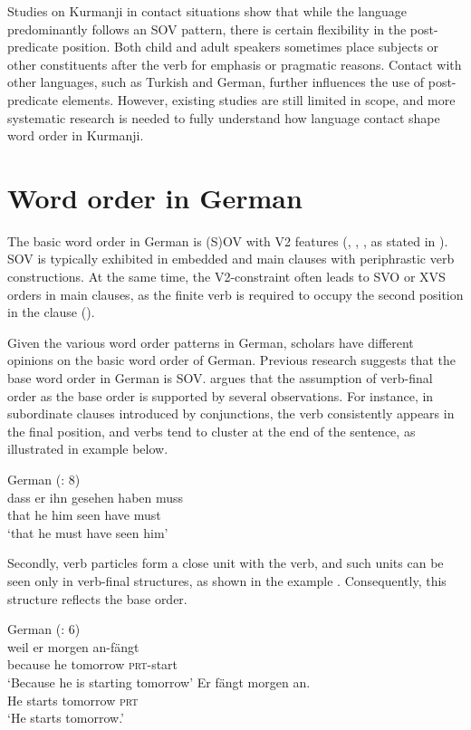 Studies on Kurmanji in contact situations show that while the language predominantly follows an SOV pattern, there is certain flexibility in the post-predicate position. Both child and adult speakers sometimes place subjects or other constituents after the verb for emphasis or pragmatic reasons. Contact with other languages, such as Turkish and German, further influences the use of post-predicate elements. However, existing studies are still limited in scope, and more systematic research is needed to fully understand how language contact shape word order in Kurmanji.

\section{Word order in German}\label{sec:key:3.5}

The basic word order in German is (S)OV with V2 features (\citealt{Fourquet1977}, \citealt{Bach1962}, \citealt{Bierwisch1966}, as stated in \citealt{kiss_41_2015}). SOV is typically exhibited in embedded and main clauses with periphrastic verb constructions. At the same time, the V2-constraint often leads to SVO or XVS orders in main clauses, as the finite verb is required to occupy the second position in the clause (\citealt{Czinglar2013, Czinglar2014}).

Given the various word order patterns in German, scholars have different opinions on the basic word order of German. Previous research suggests that the base word order in German is SOV. \citet{Muller2023} argues that the assumption of verb-final order as the base order is supported by several observations. For instance, in subordinate clauses introduced by conjunctions, the verb consistently appears in the final position, and verbs tend to cluster at the end of the sentence, as illustrated in example  below.

\ea%
  \label{ex:key:19} German (\citealt{Muller2023}: 8) \\
\gll dass  er  ihn  gesehen  haben  muss \\
that  he  him  seen    have  must\\
\glt ‘that he must have seen him’ 
  \z

Secondly, verb particles form a close unit with the verb, and such units can be seen only in verb-final structures, as shown in the example . Consequently, this structure reflects the base order.

\ea \label{ex:key:20} German (\citealt{Muller2023}: 6) \\
\ea\label{ex:key:20a}
\gll weil    er  morgen  an-fängt\\
because  he  tomorrow  \textsc{prt}-start\\
\glt ‘Because he is starting tomorrow’
\ex\label{ex:key:20b}
\gll Er   fängt   morgen   an.\\
He  starts  tomorrow  \textsc{prt}\\
\glt   ‘He starts tomorrow.’ 
\z
\z

